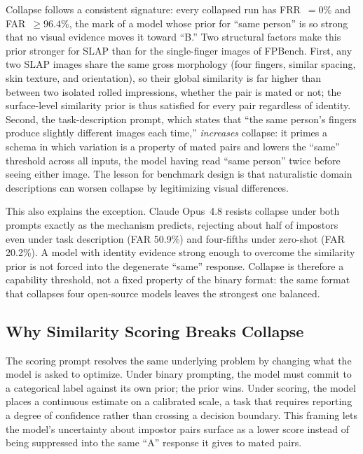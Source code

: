 \documentclass[runningheads]{llncs}
\begin{document}
Collapse follows a consistent signature: every collapsed run has FRR~$= 0\%$
and FAR~$\geq 96.4\%$, the mark of a model whose prior for ``same person'' is
so strong that no visual evidence moves it toward ``B.'' Two structural
factors make this prior stronger for SLAP than for the single-finger images
of FPBench. First, any two SLAP images share the same gross morphology (four
fingers, similar spacing, skin texture, and orientation), so their global
similarity is far higher than between two isolated rolled impressions,
whether the pair is mated or not; the surface-level similarity prior is thus
satisfied for every pair regardless of identity. Second, the task-description
prompt, which states that ``the same person's fingers produce slightly
different images each time,'' \emph{increases} collapse: it primes a schema in
which variation is a property of mated pairs and lowers the ``same'' threshold
across all inputs, the model having read ``same person'' twice before seeing
either image. The lesson for benchmark design is that naturalistic domain
descriptions can worsen collapse by legitimizing visual differences.

This also explains the exception. Claude Opus~4.8 resists collapse under both
prompts exactly as the mechanism predicts, rejecting about half of impostors
even under task description (FAR 50.9\%) and four-fifths under zero-shot
(FAR 20.2\%). A model with identity evidence strong enough to overcome the
similarity prior is not forced into the degenerate ``same'' response. Collapse
is therefore a capability threshold, not a fixed property of the binary
format: the same format that collapses four open-source models leaves the
strongest one balanced.

\subsection{Why Similarity Scoring Breaks Collapse}

The scoring prompt resolves the same underlying problem by changing what
the model is asked to optimize.
Under binary prompting, the model must commit to a categorical label
against its own prior; the prior wins.
Under scoring, the model places a continuous estimate on a calibrated
scale, a task that requires reporting a degree of confidence rather than
crossing a decision boundary.
This framing lets the model's uncertainty about impostor pairs surface as a
lower score instead of being suppressed into the same ``A'' response it
gives to mated pairs.
\end{document}
